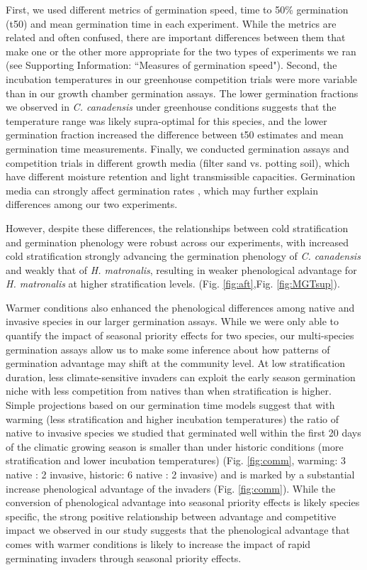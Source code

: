 \documentclass{article}[11pt]
\begin{document}
First, we used different metrics of germination speed, time to 50\% germination (t50) and mean germination time in each experiment. While the metrics are related and often confused, there are important differences between them that make one or the other more appropriate for the two types of experiments we ran (see Supporting Information: ``Measures of germination speed"). Second, the incubation temperatures in our greenhouse competition trials were more variable than in our growth chamber germination assays. The lower germination fractions we observed in \textit{C. canadensis} under greenhouse conditions suggests that the temperature range was likely supra-optimal for this species, and the lower germination fraction increased the difference between t50 estimates and mean germination time measurements. Finally, we  conducted germination assays and competition trials in different growth media (filter sand vs. potting soil), which have different moisture retention and light transmissible capacities. Germination media can strongly affect germination rates \citep{Baskin2014}, which may further explain differences among our two experiments.

However, despite these differences, the relationships between cold stratification and germination phenology were robust across our experiments, with increased cold stratification strongly advancing the germination phenology of \textit{C. canadensis} and weakly that of \textit{H. matronalis}, resulting in weaker phenological advantage for \textit{H. matronalis} at higher stratification levels. (Fig. \ref{fig:aft},Fig. \ref{fig:MGTsup}).

Warmer conditions also enhanced the phenological differences among native and invasive species in our larger germination assays. While we were only able to quantify the impact of seasonal priority effects for two species, our multi-species germination assays allow us to make some inference about how patterns of germination advantage may shift at the community level. At low stratification duration, less climate-sensitive invaders can exploit the early season germination niche with less competition from natives than when stratification is higher. Simple projections based on our germination time models suggest that with warming (less stratification and higher incubation temperatures) the ratio of native to invasive species we studied that germinated well within the first 20 days of the climatic growing season is smaller than under historic conditions (more stratification and lower incubation temperatures) (Fig. \ref{fig:comm}, warming: 3 native : 2 invasive, historic: 6 native : 2 invasive) and is marked by a substantial increase phenological advantage of the invaders (Fig. \ref{fig:comm}). While the conversion of phenological advantage into seasonal priority effects is likely species specific, the strong positive relationship between advantage and competitive impact we observed in our study suggests that the phenological advantage that comes with warmer conditions is likely to increase the impact of rapid germinating invaders through seasonal priority effects. 
\end{document}

